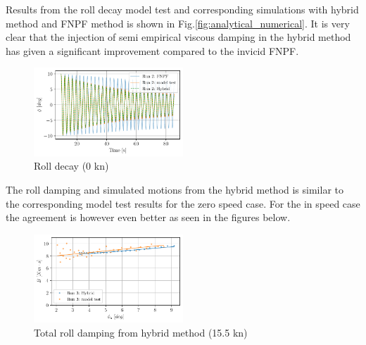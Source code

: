     Results from the roll decay model test and corresponding simulations
with hybrid method and FNPF method is shown in
Fig.\ref{fig:analytical_numerical}. It is very clear that the
injection of semi empirical viscous damping in the hybrid method has
given a significant improvement compared to the invicid FNPF.

    

    \begin{figure}[H]
        \begin{center}\includegraphics[width = 0.5\textwidth]{figures/hybrid_0_time.pdf}\end{center}
        \vspace{-1cm}
        \caption{Roll decay (0 kn)}
        \label{fig:hybrid_0_time}
    \end{figure}
    
    The roll damping and simulated motions from the hybrid method is similar
to the corresponding model test results for the zero speed case. For the
in speed case the agreement is however even better as seen in the
figures below.

    \begin{figure}[H]
        \begin{center}\includegraphics[width = 0.5\textwidth]{figures/hybrid_speed_amplitudes.pdf}\end{center}
        \vspace{-1cm}
        \caption{Total roll damping from hybrid method (15.5 kn)}
        \label{fig:hybrid_speed_amplitudes}
    \end{figure}
    

